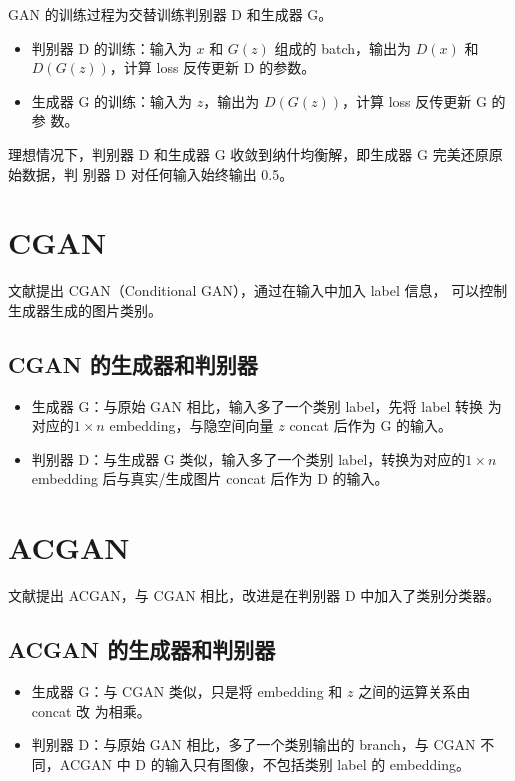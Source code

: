 GAN 的训练过程为交替训练判别器 D 和生成器 G。

\begin{itemize}
  \item 判别器 D 的训练：输入为 $x$ 和 $G(z)$ 组成的 batch，输出为 $D(x)$ 和
    $D(G(z))$，计算 loss 反传更新 D 的参数。
  \item 生成器 G 的训练：输入为 $z$，输出为 $D(G(z))$，计算 loss 反传更新 G 的参
    数。
\end{itemize}

理想情况下，判别器 D 和生成器 G 收敛到纳什均衡解，即生成器 G 完美还原原始数据，判
别器 D 对任何输入始终输出 0.5。

\section{CGAN}
文献提出 CGAN（Conditional GAN），通过在输入中加入 label 信息，
可以控制生成器生成的图片类别。

\subsection{CGAN 的生成器和判别器}
\begin{itemize}
  \item 生成器 G：与原始 GAN 相比，输入多了一个类别 label，先将 label 转换
    为对应的$1 \times n$ embedding，与隐空间向量 $z$ concat 后作为 G 的输入。
  \item 判别器 D：与生成器 G 类似，输入多了一个类别 label，转换为对应的$1 \times
    n$ embedding 后与真实/生成图片 concat 后作为 D 的输入。
\end{itemize}

\section{ACGAN}
文献提出 ACGAN，与 CGAN 相比，改进是在判别器 D 中加入了类别分类器。

\subsection{ACGAN 的生成器和判别器}
\begin{itemize}
  \item 生成器 G：与 CGAN 类似，只是将 embedding 和 $z$ 之间的运算关系由 concat 改
    为相乘。
  \item 判别器 D：与原始 GAN 相比，多了一个类别输出的 branch，与 CGAN 不
    同，ACGAN 中 D 的输入只有图像，不包括类别 label 的 embedding。
\end{itemize}

